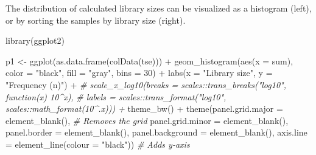 \documentclass[
]{book}
\newenvironment{Shaded}{\begin{snugshade}}{\end{snugshade}}
\newcommand{\AttributeTok}[1]{\textcolor[rgb]{0.77,0.63,0.00}{#1}}
\newcommand{\CommentTok}[1]{\textcolor[rgb]{0.56,0.35,0.01}{\textit{#1}}}
\newcommand{\DecValTok}[1]{\textcolor[rgb]{0.00,0.00,0.81}{#1}}
\newcommand{\FunctionTok}[1]{\textcolor[rgb]{0.00,0.00,0.00}{#1}}
\newcommand{\NormalTok}[1]{#1}
\newcommand{\OtherTok}[1]{\textcolor[rgb]{0.56,0.35,0.01}{#1}}
\newcommand{\SpecialCharTok}[1]{\textcolor[rgb]{0.00,0.00,0.00}{#1}}
\newcommand{\StringTok}[1]{\textcolor[rgb]{0.31,0.60,0.02}{#1}}
\begin{document}
The distribution of calculated library sizes can be visualized as a
histogram (left), or by sorting the samples by library size (right).

\begin{Shaded}
\begin{Highlighting}[]
\FunctionTok{library}\NormalTok{(ggplot2)}

\NormalTok{p1 }\OtherTok{\textless{}{-}} \FunctionTok{ggplot}\NormalTok{(}\FunctionTok{as.data.frame}\NormalTok{(}\FunctionTok{colData}\NormalTok{(tse))) }\SpecialCharTok{+}
        \FunctionTok{geom\_histogram}\NormalTok{(}\FunctionTok{aes}\NormalTok{(}\AttributeTok{x =}\NormalTok{ sum), }\AttributeTok{color =} \StringTok{"black"}\NormalTok{, }\AttributeTok{fill =} \StringTok{"gray"}\NormalTok{, }\AttributeTok{bins =} \DecValTok{30}\NormalTok{) }\SpecialCharTok{+}
        \FunctionTok{labs}\NormalTok{(}\AttributeTok{x =} \StringTok{"Library size"}\NormalTok{, }\AttributeTok{y =} \StringTok{"Frequency (n)"}\NormalTok{) }\SpecialCharTok{+} 
        \CommentTok{\# scale\_x\_log10(breaks = scales::trans\_breaks("log10", function(x) 10\^{}x), }
        \CommentTok{\# labels = scales::trans\_format("log10", scales::math\_format(10\^{}.x))) +}
        \FunctionTok{theme\_bw}\NormalTok{() }\SpecialCharTok{+}
        \FunctionTok{theme}\NormalTok{(}\AttributeTok{panel.grid.major =} \FunctionTok{element\_blank}\NormalTok{(), }\CommentTok{\# Removes the grid}
          \AttributeTok{panel.grid.minor =} \FunctionTok{element\_blank}\NormalTok{(),}
          \AttributeTok{panel.border =} \FunctionTok{element\_blank}\NormalTok{(),}
          \AttributeTok{panel.background =} \FunctionTok{element\_blank}\NormalTok{(),}
          \AttributeTok{axis.line =} \FunctionTok{element\_line}\NormalTok{(}\AttributeTok{colour =} \StringTok{"black"}\NormalTok{)) }\CommentTok{\# Adds y{-}axis}


\end{Highlighting}
\end{Shaded}
\end{document}
